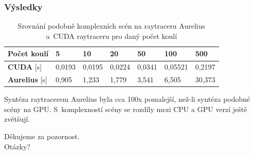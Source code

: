 \documentclass{beamer}
\begin{document}
\begin{frame}[t,fragile]
\begin{figure}[htbp]
\begin{subfigure}[b]{0.49\textwidth}
        \end{subfigure}
        
        \end{figure}

	\end{frame}
	
	

	
	
		\begin{frame}[t,fragile]
		\frametitle{Výsledky}					
		\small
		\begin{table}
\centering
\begin{tabular}{ | l | l | l | l | l | l | l |}
\hline
\textbf{Počet koulí} & 5  & 10  & 20 & 50 & 100 & 500 \\
\hline
\textbf{CUDA} [s] & 0,0193 & 0,0195 & 0,0224 & 0,0341 & 0,05521 & 0,2197 \\
\hline
\textbf{Aurelius} [s] & 0,905 & 1,233 & 1,779 & 3,541 & 6,505 & 30,373 \\
\hline
\end{tabular}
\caption{Srovnání podobně komplexních scén na raytraceru Aurelius a~CUDA raytraceru pro daný počet koulí}
\end{table}

Syntéza raytracerem Aurelius byla cca 100x pomalejší, než-li syntéza podobné scény na GPU. S~komplexností scény se rozdíly mezi CPU a GPU verzí ještě zvětšují.

	\end{frame}
	
		
				{
\begin{frame}[plain]
\end{frame}
}

	\begin{frame}[t,fragile]

		\vspace{30mm}
\centering
\Huge Děkujeme za pozornost.\\ Otázky?
						
		
	\end{frame}

	
\end{document}
